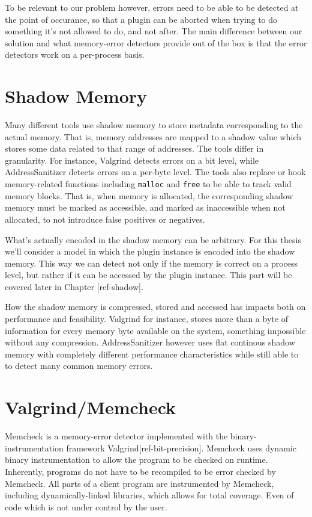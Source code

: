 To be relevant to our problem however, errors need to be able to be detected at
the point of occurance, so that a plugin can be aborted when trying to do
something it's not allowed to do, and not after. The main difference between our
solution and what memory-error detectors provide out of the box is that the
error detectors work on a per-process basis.


\section {Shadow Memory}

Many different tools use shadow memory to store metadata corresponding to the
actual memory. That is, memory addresses are mapped to a shadow value which
stores some data related to that range of addresses. The tools differ in
granularity. For instance, Valgrind detects errors on a bit level, while
AddressSanitizer detects errors on a per-byte level. The tools also replace or
hook memory-related functions including \texttt{malloc} and \texttt{free} to be
able to track valid memory blocks. That is, when memory is allocated, the
corresponding shadow memory must be marked as accessible, and marked as
inaccessible when not allocated, to not introduce false positives or negatives.

What's actually encoded in the shadow memory can be arbitrary. For this thesis
we'll consider a model in which the plugin instance is encoded into the shadow
memory. This way we can detect not only if the memory is correct on a process
level, but rather if it can be accessed by the plugin instance. This part will
be covered later in Chapter [ref-shadow].

How the shadow memory is compressed, stored and accessed has impacts both on
performance and feasibility. Valgrind for instance, stores more than a byte of
information for every memory byte available on the system, something impossible
without any compression. AddressSanitizer however uses flat continous shadow
memory with completely different performance characteristics while still able to
to detect many common memory errors.


\section {Valgrind/Memcheck}

Memcheck is a memory-error detector implemented with the binary-instrumentation
framework Valgrind[ref-bit-precision].
Memcheck uses dynamic binary instrumentation to allow the
program to be checked on runtime.
Inherently, programs do not have to be recompiled to be error checked by
Memcheck.
All parts of a client program are instrumented by Memcheck, including
dynamically-linked libraries, which allows for total coverage.
Even of code which is not under control by the user.

